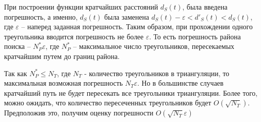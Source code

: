 При построении функции кратчайших расстояний $d_S(t)$, была введена
погрешность, а именно, $d_S(t)$ была заменена $d_S(t) - \varepsilon < d'_S(t) < d_S(t)$,
где $\varepsilon$ -- наперед заданная погрешность. Таким образом, при прохождении
одного треугольника вводится погрешность не более $\varepsilon$. То есть
погрешность района поиска -- $N^*_P\varepsilon$, где $N^*_P$ --
максимальное число треугольников, пересекаемых кратчайшим путем
до границ района.

Так как $N^*_P \leq N_T$, где $N_T$ - количество треугольников в триангуляции,
то максимальная возможная погрешность $N_T\varepsilon$.
Но в большинстве случаев кратчайший путь не будет пересекать все треугольники
триангуляции. Более того, можно ожидать, что количество пересеченных
треугольников будет $O(\sqrt{N_T})$. Предположив это, получим оценку погрешности
$O(\sqrt{N_T}\varepsilon)$
